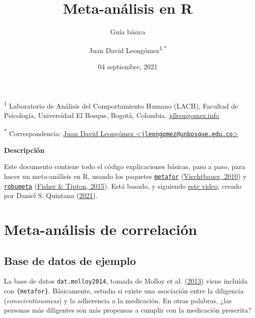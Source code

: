 \documentclass[
]{article}
\title{Meta-análisis en R}
\subtitle{Guía básica}
\author{Juan David Leongómez\textsuperscript{1,*}}
\date{04 septiembre, 2021}
\begin{document}
\maketitle

\textsuperscript{1} Laboratorio de Análisis del Comportamiento Humano
(LACH), Facultad de Psicología, Universidad El Bosque, Bogotá, Colombia.
\href{https://jdleongomez.info/es/}{jdleongomez.info}

\textsuperscript{*} Correspondencia:
\href{mailto:jleongomez@unbosque.edu.co}{Juan David Leongómez
\textless{}\href{mailto:jleongomez@unbosque.edu.co}{\nolinkurl{jleongomez@unbosque.edu.co}}\textgreater{}}

\begin{center}
\textbf{Descripción}
\end{center}

Este documento contiene todo el código explicaciones básicas, paso a
paso, para hacer un meta-análisis en R, usando los paquetes
\href{https://www.metafor-project.org/doku.php}{\texttt{metafor}}
(\protect\hyperlink{ref-viechtbauer2010}{Viechtbauer, 2010}) y
\href{https://www.rdocumentation.org/packages/robumeta}{\texttt{robumeta}}
(\protect\hyperlink{ref-fisherRobumetaRpackageRobust2015}{Fisher \&
Tipton, 2015}). Está basado, y siguiendo
\href{https://youtu.be/lH4VZMTEZSc}{este video}, creado por Daniel S.
Quintana
(\protect\hyperlink{ref-quintanaHowPerformMetaanalysis2021}{2021}).

{\hypersetup{hidelinks}
\setcounter{tocdepth}{5}
\tableofcontents
}

\hypertarget{meta-anuxe1lisis-de-correlaciuxf3n}{%
\section{Meta-análisis de
correlación}\label{meta-anuxe1lisis-de-correlaciuxf3n}}

\hypertarget{base-de-datos-de-ejemplo}{%
\subsection{Base de datos de ejemplo}\label{base-de-datos-de-ejemplo}}

La base de datos \texttt{dat.molloy2014}, tomada de Molloy et al.
(\protect\hyperlink{ref-molloy2013}{2013}) viene incluída con
\texttt{\{metafor\}}. Básicamente, estudia si existe una asociación
entre la diligencia (\emph{conscientiousness}) y la adherencia a la
medicación. En otras palabras, ¿las personas más diligentes son más
propensas a cumplir con la medicación prescrita?
\end{document}
